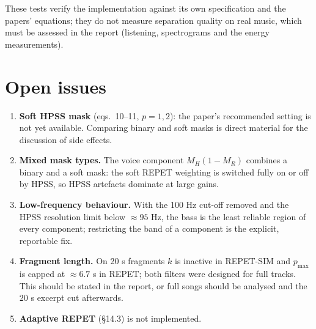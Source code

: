 \documentclass[11pt,a4paper]{article}
\begin{document}
These tests verify the implementation against its own specification and
the papers' equations; they do not measure separation quality on real
music, which must be assessed in the report (listening, spectrograms and
the energy measurements).

\section{Open issues}

\begin{enumerate}
  \item \textbf{Soft HPSS mask} (eqs.~10--11, $p=1,2$): the paper's
        recommended setting is not yet available. Comparing binary and soft
        masks is direct material for the discussion of side effects.
  \item \textbf{Mixed mask types.} The voice component $M_H(1-M_R)$
        combines a binary and a soft mask: the soft REPET weighting is
        switched fully on or off by HPSS, so HPSS artefacts dominate at large
        gains.
  \item \textbf{Low-frequency behaviour.} With the 100 Hz cut-off removed
        and the HPSS resolution limit below $\approx95$ Hz, the bass is the
        least reliable region of every component; restricting the band of a
        component is the explicit, reportable fix.
  \item \textbf{Fragment length.} On 20 s fragments $k$ is inactive in
        REPET-SIM and $p_{\max}$ is capped at $\approx6.7$ s in REPET; both
        filters were designed for full tracks. This should be stated in the
        report, or full songs should be analysed and the 20 s excerpt cut
        afterwards.
  \item \textbf{Adaptive REPET} (\S14.3) is not implemented.
\end{enumerate}
\end{document}
